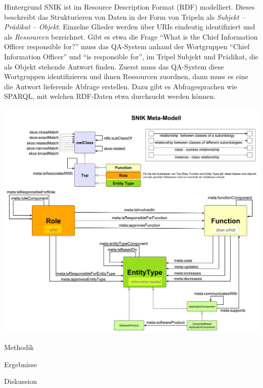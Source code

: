 \documentclass[portrait,final,a0paper,fontscale=0.320]{imiseposter}
\begin{document}
\begin{poster}
\begin{posterbox}[name=background,column=0,row=0]{Hintergrund}
SNIK ist im Resource Description Format (RDF) modelliert.
Dieses beschreibt das Strukturieren von Daten in der Form von Tripeln als \emph{Subjekt -- Prädikat --  Objekt}.
Einzelne Glieder werden über URIs eindeutig identifiziert und als \emph{Ressourcen} bezeichnet.
Gibt es etwa die Frage
{\large\enquote{What is the Chief Information Officer responsible for?}}
muss das QA-System anhand der Wortgruppen \enquote{Chief Information Officer} und \enquote{is responsible for}, im Tripel Subjekt und Prädikat, die als Objekt stehende Antwort finden.
Zuerst muss das QA-System diese Wortgruppen identifizieren und ihnen Ressourcen zuordnen,
dann muss es eine die Antwort lieferende Abfrage erstellen.
Dazu gibt es Abfragesprachen wie SPARQL, mit welchen RDF-Daten etwa durchsucht werden können.

\includegraphics[width=\linewidth]{../Dokumentation/Images/snik-metamodel.pdf}

\end{posterbox}
\begin{posterbox}[name=methods,below=background]{Methodik}

\end{posterbox}
\begin{posterbox}[name=results,column=1]{Ergebnisse}
  
\end{posterbox}
\begin{posterbox}[name=discussion,column=1,below=results]{Diskussion}


\end{posterbox}
\end{poster}
\end{document}
